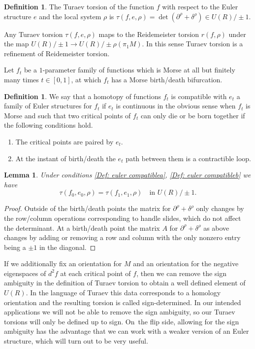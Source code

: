 \documentclass[JEP,XML,SOM,Unicode,NoFloatCountersInSection]{cedram}
\newenvironment{enumeratea}
{\bgroup\def\theenumi{\alph{enumi}}\begin{enumerate}}
{\end{enumerate}\egroup}
\theoremstyle{plain}
\newtheorem{lemma}[theorem]{Lemma}
\theoremstyle{definition}
\newtheorem{definition}[theorem]{Definition}
\begin{document}
\begin{definition}
The Turaev torsion of the function $f$ with respect to the Euler structure $e$ and the local system $\rho$ is $\tau( f,e, \rho)=\det(\partial^\rho + \delta^\rho) \in U(R) / \pm 1$.
\end{definition}

Any Turaev torsion $\tau(f, e, \rho)$ maps to the Reidemeister torsion $r(f, \rho)$ under the map $U(R) / \pm 1 \to U(R) / \pm \rho( \pi_1M)$. In this sense Turaev torsion is a refinement of Reidemeister torsion.

Let $f_t$ be a $1$-parameter family of functions which is Morse at all but finitely many times $t \in [0,1]$, at which $f_t$ has a Morse birth/death bifurcation.

\begin{definition}\label{Def: euler compatible} We say that a homotopy of functions $f_t$ is compatible with $e_t$ a family of Euler structures for $f_t$ if $e_t$ is continuous in the obvious sense when $f_t$ is Morse and such that two critical points of $f_t$ can only die or be born together if the following conditions hold.
\begin{enumeratea}
\item\label{Def: euler compatiblea}
The critical points are paired by $e_t$.
\item\label{Def: euler compatibleb}
At the instant of birth/death the $e_t$ path between them is a contractible loop.
\end{enumeratea}
\end{definition}

\begin{lemma}\label{inv}
Under conditions \eqref{Def: euler compatiblea}, \eqref{Def: euler compatibleb} we have
\[
\tau(f_0,e_0, \rho)=\tau(f_1,e_1, \rho)\quad\text{in }U(R) / \pm1.
\]
\end{lemma}

\begin{proof}
Outside of the birth/death points the matrix for $\partial^\rho + \delta^\rho$ only changes by the row/column operations corresponding to handle slides, which do not affect the determinant. At a birth/death point the matrix $A$ for $\partial^\rho + \delta^\rho$ as above changes by adding or removing a row and column with the only nonzero entry being a $\pm 1$ in the diagonal. \end{proof}

If we additionally fix an orientation for $M$ and an orientation for the negative eigenspaces of $d^2f$ at each critical point of $f$, then we can remove the sign ambiguity in the definition of Turaev torsion to obtain a well defined element of $ U(R)$. In the language of Turaev this data corresponds to a homology orientation and the resulting torsion is called sign-determined. In our intended applications we will not be able to remove the sign ambiguity, so our Turaev torsions will only be defined up to sign. On~the flip side, allowing for the sign ambiguity has the advantage that we can work with a weaker version of an Euler structure, which will turn out to be very useful.
\end{document}
